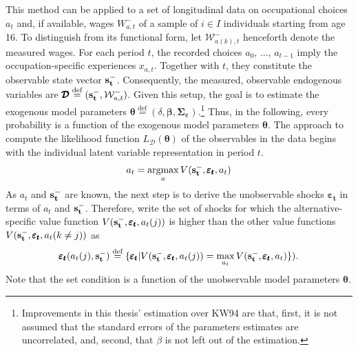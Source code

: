 \documentclass[a4paper,12pt]{article}
\DeclareMathOperator*{\argmax}{argmax}
\newcommand*{\defeq}{\stackrel{\text{def}}{=}}
\begin{document}
This method can be applied to a set of longitudinal data on occupational choices $a_t$ and, if available, wages $W_{a,t}^{-}$ of a sample of $i \in I$ individuals starting from age 16. To distinguish from its functional form, let $\mathcal{W}^{-}_{a(k),t}$ henceforth denote the measured wages. For each period $t$, the recorded choices $a_0$, ..., $a_{t-1}$  imply the occupation-specific experiences $x_{a,t}$. Together with $t$, they constitute the observable state vector $\bold{s_t^-}$. Consequently, the measured, observable endogenous variables are $\pmb{\mathcal{D}}\defeq(\bold{s_t^-},\mathcal{W}^{-}_{a,t})$. Given this setup, the goal is to estimate the exogenous model parameters $\pmb{\theta}\defeq(\delta, \pmb{\beta}, \pmb{\Sigma_\varepsilon})$.\footnote{Improvements in this thesis' estimation over KW94 are that, first, it is not assumed that the standard errors of the parameters estimates are uncorrelated, and, second, that $\beta$ is not left out of the estimation.} Thus, in the following, every probability is a function of the exogenous model parameters $\pmb{\theta}$.
The approach to compute the likelihood function $L_{\pmb{\mathcal{D}}}(\pmb{\theta})$ of the observables in the data begins with the individual latent variable representation in period $t$.
\begin{align}
a_t = \argmax_a V(\bold{s_t^-},\pmb{\varepsilon_t},a_t)
\end{align}
As $a_t$ and $\bold{s_t^-}$ are known, the next step is to derive the unobservable shocks $\pmb{\varepsilon_t}$ in terms of $a_t$ and $\bold{s_t^-}$. Therefore, write the set of shocks for which the alternative-specific value function $V(\bold{s_t^-},\pmb{\varepsilon_t},a_t(j))$ is higher than the other value functions $V(\bold{s_t^-},\pmb{\varepsilon_t},a_t(k\neq j))$ as
\begin{align}
\pmb{\varepsilon_t}(a_t(j),\bold{s_t^-}) \defeq \{\pmb{\varepsilon_t}|V(\bold{s_t^-},\pmb{\varepsilon_t},a_t(j)) = \max_{a_t} V(\bold{s_t^-},\pmb{\varepsilon_t},a_t)\}).
\end{align}
Note that the set condition is a function of the unobservable model parameters $\pmb{\theta}$.
\end{document}
